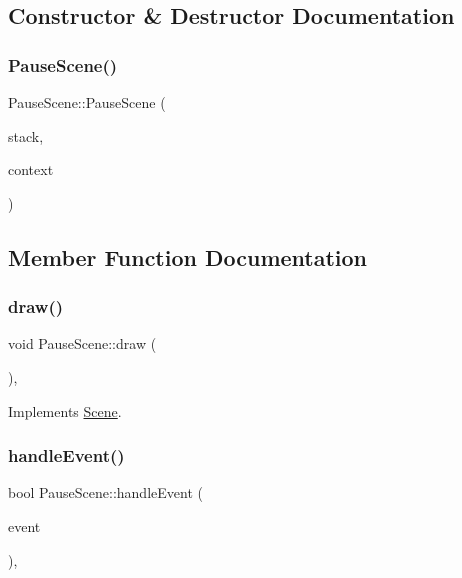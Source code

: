 \subsection{Constructor \& Destructor Documentation}
\mbox{\label{class_pause_scene_a65ac2aa9fca0b1027481e60417749c4f}} 
\subsubsection{\texorpdfstring{Pause\+Scene()}{PauseScene()}}
{\footnotesize\ttfamily Pause\+Scene\+::\+Pause\+Scene (\begin{DoxyParamCaption}\item[{\hyperlink{class_scene_stack}{Scene\+Stack} \&}]{stack,  }\item[{\hyperlink{struct_scene_1_1_context}{Context}}]{context }\end{DoxyParamCaption})}



\subsection{Member Function Documentation}
\mbox{\label{class_pause_scene_abfd1398a064a83b3ae6ac5fd98aebf05}} 
\subsubsection{\texorpdfstring{draw()}{draw()}}
{\footnotesize\ttfamily void Pause\+Scene\+::draw (\begin{DoxyParamCaption}{ }\end{DoxyParamCaption})\hspace{0.3cm}{\ttfamily [override]}, {\ttfamily [virtual]}}



Implements \hyperlink{class_scene_a789c16961aa1e316b2a4a05b95187546}{Scene}.

\mbox{\label{class_pause_scene_adeb06e37e0a2afa297ddbe795c3cbe94}} 
\subsubsection{\texorpdfstring{handle\+Event()}{handleEvent()}}
{\footnotesize\ttfamily bool Pause\+Scene\+::handle\+Event (\begin{DoxyParamCaption}\item[{const sf\+::\+Event \&}]{event }\end{DoxyParamCaption})\hspace{0.3cm}{\ttfamily [override]}, {\ttfamily [virtual]}}




